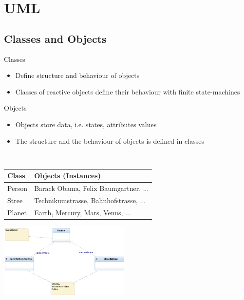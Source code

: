 \section{UML}

\subsection{Classes and Objects}
\begin{paracol}{2}
    Classes
    \begin{itemize}
        \item Define structure and behaviour of objects
        \item Classes of reactive objects define their behaviour with finite state-machines
    \end{itemize}
    \switchcolumn
    Objects
    \begin{itemize}
        \item Objects store data, i.e. states, attributes values
        \item The structure and the behaviour of objects is defined in classes
    \end{itemize}
    \switchcolumn
    $ $\\
    \begin{tabular}{ll}\hline
        Class  & Objects (Instances)                   \\\hline
        Person & Barack Obama, Felix Baumgartner, ...  \\
        Stree  & Technikumstrasse, Bahnhofstrasse, ... \\
        Planet & Earth, Mercury, Mars, Venus, ...      \\\hline
    \end{tabular}
    \switchcolumn
    \includegraphics[width=0.49\textwidth]{images/UML/class_objects.png}
\end{paracol}

